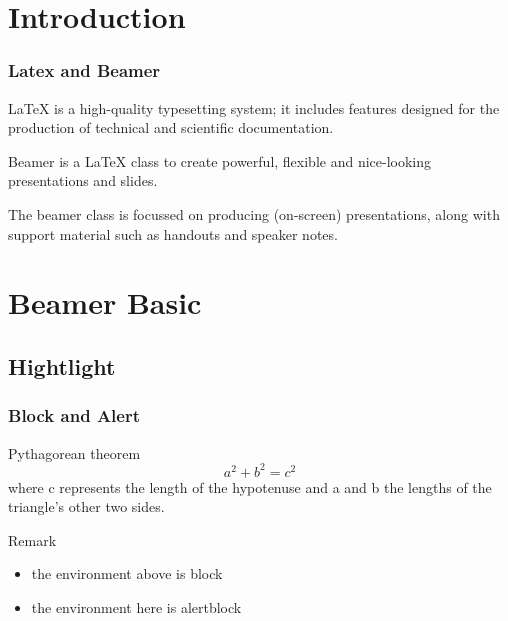 \frame[plain]{\titlepage}

\section{Introduction}

\begin{frame}
    \frametitle{Latex and Beamer}
    
    LaTeX is a high-quality typesetting system; 
    it includes features designed for the production of 
    technical and scientific documentation.

    \vspace{0.4cm}

    \pause

    Beamer is a LaTeX class to create powerful, 
    flexible and nice-looking presentations and slides. 
    
    The beamer class is focussed on producing (on-screen) presentations, 
    along with support material such as handouts and speaker notes.
    
\end{frame}

\section{Beamer Basic}
\subsection{Hightlight}

\begin{frame}
    \frametitle{Block and Alert}

    \begin{block}{Pythagorean theorem}
        \vspace*{-\baselineskip}\setlength\belowdisplayshortskip{0.6pt}
        $$a^2 + b^2 = c^2$$
        where c represents the length of the hypotenuse and 
        a and b the lengths of the triangle's other two sides.
    \end{block}
    
    \begin{alertblock}{Remark}
        \begin{itemize}
            \item the environment above is \alert{block}
            \item the environment here is \alert{alertblock}
        \end{itemize}
    \end{alertblock}

\end{frame}


